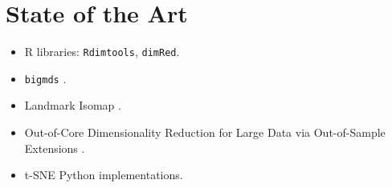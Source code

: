 \section{State of the Art}

\begin{itemize}
    \item R libraries: \verb|Rdimtools|, \verb|dimRed|.
    \item \verb|bigmds| \cite{Delicado2024MDSBigData}.
    \item Landmark Isomap \cite{deSilvaTenenbaum2002}.
    \item Out-of-Core Dimensionality Reduction for Large Data via Out-of-Sample Extensions \cite{reichmann2024outofcoredimensionalityreductionlarge}.
    \item t-SNE Python implementations.
\end{itemize}